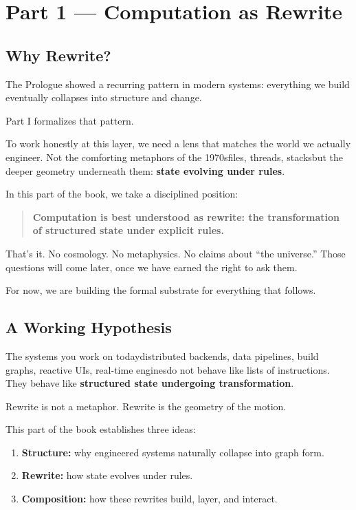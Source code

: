 \chapter*{Part 1 --- Computation as Rewrite}

\section*{Why Rewrite?}
\label{sec:why-rewrite}

The Prologue showed a recurring pattern in modern systems:  
everything we build eventually collapses into structure and change.

Part I formalizes that pattern.

To work honestly at this layer, we need a lens that matches the world we actually engineer.  
Not the comforting metaphors of the 1970s\emdash{}files, threads, stacks\emdash{}but the deeper
geometry underneath them: \textbf{state evolving under rules}.

In this part of the book, we take a disciplined position:

\begin{quote}
\textbf{Computation is best understood as rewrite:  
the transformation of structured state under explicit rules.}
\end{quote}

That’s it.  
No cosmology. No metaphysics. No claims about “the universe.”  
Those questions will come later, once we have earned the right to ask them.

For now, we are building the formal substrate for everything that follows.

\bigskip

\section*{A Working Hypothesis}
\label{sec:working-hypothesis}

The systems you work on today\emdash{}distributed backends,
data pipelines, build graphs, reactive UIs, real-time engines\emdash{}do not behave like lists of instructions.
They behave like \textbf{structured state undergoing transformation}.

Rewrite is not a metaphor.  
Rewrite is the geometry of the motion.

This part of the book establishes three ideas:

\begin{enumerate}
    \item \textbf{Structure:} why engineered systems naturally collapse into graph form.
    \item \textbf{Rewrite:} how state evolves under rules.
    \item \textbf{Composition:} how these rewrites build, layer, and interact.
\end{enumerate}

